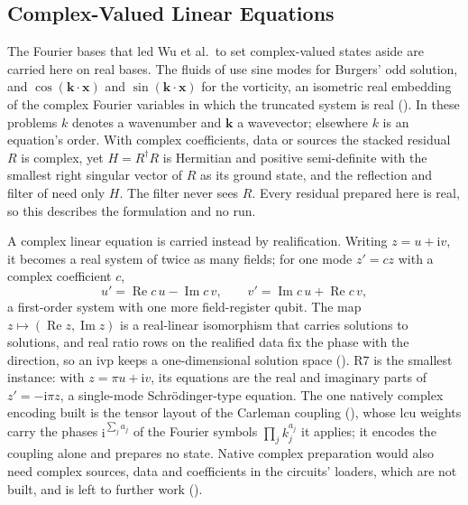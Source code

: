 \subsection{Complex-Valued Linear Equations}
\label{sec:systems-complex}

The Fourier bases that led Wu et al.\ to set complex-valued states aside are carried here on real bases. The fluids of  use sine modes for Burgers' odd solution, and $\cos(\mathbf k\cdot\mathbf x)$ and $\sin(\mathbf k\cdot\mathbf x)$ for the vorticity, an isometric real embedding of the complex Fourier variables in which the truncated system is real (). In these problems $k$ denotes a wavenumber and $\mathbf k$ a wavevector; elsewhere $k$ is an equation's order. With complex coefficients, data or sources the stacked residual $R$ is complex, yet $H=R^\dagger R$ is Hermitian and positive semi-definite with the smallest right singular vector of $R$ as its ground state, and the reflection and filter of  need only $H$. The filter never sees $R$. Every residual prepared here is real, so this describes the formulation and no run.

A complex linear equation is carried instead by realification. Writing $z=u+\mathrm{i}v$, it becomes a real system of twice as many fields; for one mode $z'=cz$ with a complex coefficient $c$,
\begin{equation}
    u'=\operatorname{Re}c\,u-\operatorname{Im}c\,v,
    \qquad
    v'=\operatorname{Im}c\,u+\operatorname{Re}c\,v,
    \label{eq:realification}
\end{equation}
a first-order system with one more field-register qubit. The map $z\mapsto(\operatorname{Re}z,\operatorname{Im}z)$ is a real-linear isomorphism that carries solutions to solutions, and real ratio rows on the realified data fix the phase with the direction, so an \gls{ivp} keeps a one-dimensional solution space (). R7 is the smallest instance: with $z=\pi u+\mathrm{i}v$, its equations are the real and imaginary parts of $z'=-\mathrm{i}\pi z$, a single-mode Schr\"odinger-type equation. The one natively complex encoding built is the tensor layout of the Carleman coupling (), whose \gls{lcu} weights carry the phases $\mathrm{i}^{\sum_ja_j}$ of the Fourier symbols $\prod_jk_j^{a_j}$ it applies; it encodes the coupling alone and prepares no state. Native complex preparation would also need complex sources, data and coefficients in the circuits' loaders, which are not built, and is left to further work ().

